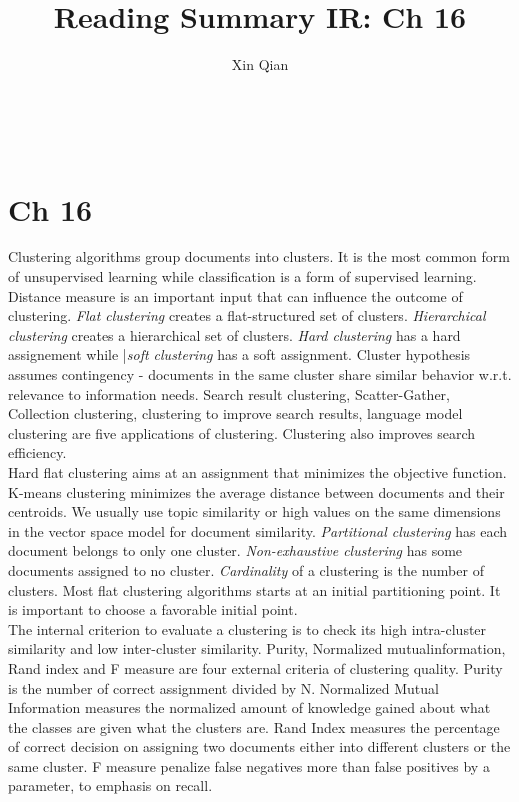 \documentclass{sig-alternate-05-2015}
\begin{document}
\title{Reading Summary IR: Ch 16}
\author{
\alignauthor
Xin Qian\\
      \\
       \\
       \\
}
\maketitle

\section{Ch 16}
Clustering algorithms group documents into clusters. It is the most common form of unsupervised learning while classification is a form of supervised learning. Distance measure is an important input that can influence the outcome of clustering. \textit{Flat clustering} creates a flat-structured set of clusters. \textit{Hierarchical clustering} creates a hierarchical set of clusters. \textit{Hard clustering} has a hard assignement while |\textit{soft clustering} has a soft assignment. Cluster hypothesis assumes contingency - documents in the same cluster share similar behavior w.r.t. relevance to information needs. Search result clustering, Scatter-Gather, Collection clustering, clustering to improve search results, language model clustering are five applications of clustering. Clustering also improves search efficiency. \\

Hard flat clustering aims at an assignment that minimizes the objective function. K-means clustering minimizes the average distance between documents and their centroids. We usually use topic similarity or high values on the same dimensions in the vector space model for document similarity. \textit{Partitional clustering} has each document belongs to only one cluster. \textit{Non-exhaustive clustering} has some documents assigned to no cluster. \textit{Cardinality} of a clustering is the number of clusters. Most flat clustering algorithms starts at an initial partitioning point. It is important to choose a favorable initial point.\\

The internal criterion to evaluate a clustering is to check its high intra-cluster similarity and low inter-cluster similarity. Purity, Normalized mutualinformation, Rand index and F measure are four external criteria of clustering quality. Purity is the number of correct assignment divided by N. Normalized Mutual Information measures the normalized amount of knowledge gained about what the classes are given what the clusters are. Rand Index measures the percentage of correct decision on assigning two documents either into different clusters or the same cluster. F measure penalize false negatives more than false positives by a parameter, to emphasis on recall.\\
\end{document}
